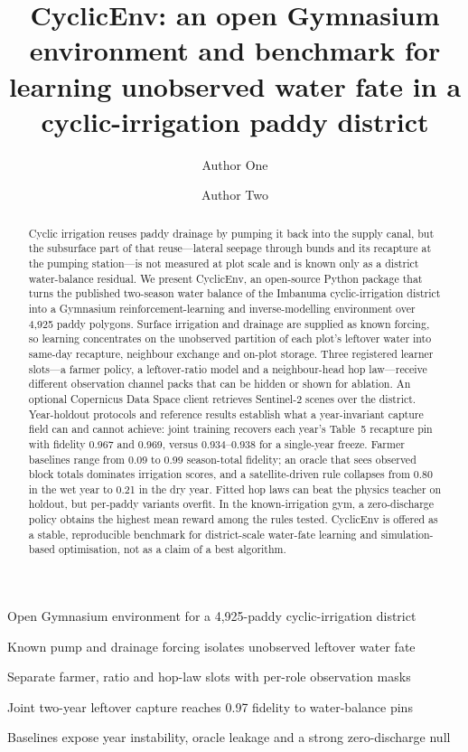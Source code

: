 \documentclass[preprint,12pt,authoryear,review]{elsarticle}
\begin{document}
\begin{frontmatter}

\title{CyclicEnv: an open Gymnasium environment and benchmark for learning unobserved water fate in a cyclic-irrigation paddy district}

\author[aff1]{Author One}
\author[aff1]{Author Two}
\address[aff1]{Affiliation to be completed}

\begin{abstract}
Cyclic irrigation reuses paddy drainage by pumping it back into the supply canal, but the subsurface part of that reuse---lateral seepage through bunds and its recapture at the pumping station---is not measured at plot scale and is known only as a district water-balance residual. We present CyclicEnv, an open-source Python package that turns the published two-season water balance of the Imbanuma cyclic-irrigation district \citep{okura2025} into a Gymnasium reinforcement-learning and inverse-modelling environment over 4,925 paddy polygons. Surface irrigation and drainage are supplied as known forcing, so learning concentrates on the unobserved partition of each plot's leftover water into same-day recapture, neighbour exchange and on-plot storage. Three registered learner slots---a farmer policy, a leftover-ratio model and a neighbour-head hop law---receive different observation channel packs that can be hidden or shown for ablation. An optional Copernicus Data Space client retrieves Sentinel-2 scenes over the district. Year-holdout protocols and reference results establish what a year-invariant capture field can and cannot achieve: joint training recovers each year's Table~5 recapture pin with fidelity 0.967 and 0.969, versus 0.934--0.938 for a single-year freeze. Farmer baselines range from 0.09 to 0.99 season-total fidelity; an oracle that sees observed block totals dominates irrigation scores, and a satellite-driven rule collapses from 0.80 in the wet year to 0.21 in the dry year. Fitted hop laws can beat the physics teacher on holdout, but per-paddy variants overfit. In the known-irrigation gym, a zero-discharge policy obtains the highest mean reward among the rules tested. CyclicEnv is offered as a stable, reproducible benchmark for district-scale water-fate learning and simulation-based optimisation, not as a claim of a best algorithm.
\end{abstract}

\begin{highlights}
\item Open Gymnasium environment for a 4,925-paddy cyclic-irrigation district
\item Known pump and drainage forcing isolates unobserved leftover water fate
\item Separate farmer, ratio and hop-law slots with per-role observation masks
\item Joint two-year leftover capture reaches 0.97 fidelity to water-balance pins
\item Baselines expose year instability, oracle leakage and a strong zero-discharge null
\end{highlights}


\end{frontmatter}
\end{document}
